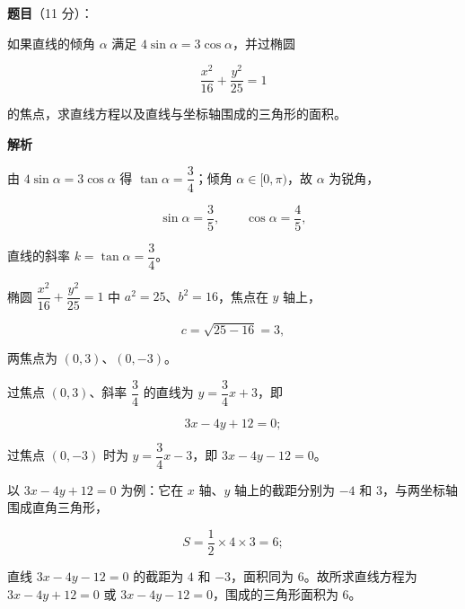 \begin{answer}

\textbf{题目}（11 分）：

如果直线的倾角 $\alpha$ 满足 $4\sin\alpha=3\cos\alpha$，并过椭圆

\nopagebreak[4]
\[
\frac{x^2}{16}+\frac{y^2}{25}=1
\]

的焦点，求直线方程以及直线与坐标轴围成的三角形的面积。

\textbf{解析}

由 $4\sin\alpha=3\cos\alpha$ 得 $\tan\alpha=\dfrac34$；倾角 $\alpha\in[0,\pi)$，故 $\alpha$ 为锐角，

\nopagebreak[4]
\[
\sin\alpha=\frac35,\qquad \cos\alpha=\frac45,
\]

直线的斜率 $k=\tan\alpha=\dfrac34$。

椭圆 $\dfrac{x^2}{16}+\dfrac{y^2}{25}=1$ 中 $a^2=25$、$b^2=16$，焦点在 $y$ 轴上，

\nopagebreak[4]
\[
c=\sqrt{25-16}=3,
\]

两焦点为 $(0,3)$、$(0,-3)$。

过焦点 $(0,3)$、斜率 $\dfrac34$ 的直线为 $y=\dfrac34x+3$，即

\nopagebreak[4]
\[
3x-4y+12=0;
\]

过焦点 $(0,-3)$ 时为 $y=\dfrac34x-3$，即 $3x-4y-12=0$。

以 $3x-4y+12=0$ 为例：它在 $x$ 轴、$y$ 轴上的截距分别为 $-4$ 和 $3$，与两坐标轴围成直角三角形，

\nopagebreak[4]
\[
S=\frac12\times 4\times 3=6;
\]

直线 $3x-4y-12=0$ 的截距为 $4$ 和 $-3$，面积同为 $6$。故所求直线方程为 $3x-4y+12=0$ 或 $3x-4y-12=0$，围成的三角形面积为 $6$。


\end{answer}
